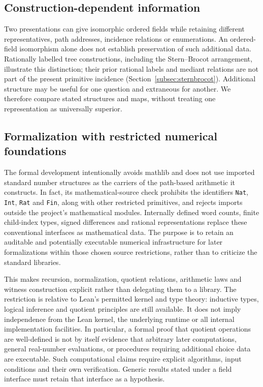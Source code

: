 \documentclass[11pt,reqno]{amsart}
\theoremstyle{definition}\newtheorem{definition}[theorem]{Definition}
\theoremstyle{remark}\newtheorem{remark}[theorem]{Remark}
\begin{document}
\subsection{Construction-dependent information}
Two presentations can give isomorphic ordered fields while retaining different representatives, path addresses, incidence relations or enumerations. An ordered-field isomorphism alone does not establish preservation of such additional data. Rationally labelled tree constructions, including the Stern--Brocot arrangement, illustrate this distinction; their prior rational labels and mediant relations are not part of the present primitive incidence (Section~\ref{subsec:sternbrocot}). Additional structure may be useful for one question and extraneous for another. We therefore compare stated structures and maps, without treating one representation as universally superior.

\subsection{Formalization with restricted numerical foundations}
The formal development intentionally avoids mathlib and does not use imported standard number structures as the carriers of the path-based arithmetic it constructs. In fact, its mathematical-source check prohibits the identifiers \texttt{Nat}, \texttt{Int}, \texttt{Rat} and \texttt{Fin}, along with other restricted primitives, and rejects imports outside the project's mathematical modules. Internally defined word counts, finite child-index types, signed differences and rational representations replace these conventional interfaces as mathematical data. The purpose is to retain an auditable and potentially executable numerical infrastructure for later formalizations within those chosen source restrictions, rather than to criticize the standard libraries.

This makes recursion, normalization, quotient relations, arithmetic laws and witness construction explicit rather than delegating them to a library. The restriction is relative to Lean's permitted kernel and type theory: inductive types, logical inference and quotient principles are still available. It does not imply independence from the Lean kernel, the underlying runtime or all internal implementation facilities. In particular, a formal proof that quotient operations are well-defined is not by itself evidence that arbitrary later computations, general real-number evaluations, or procedures requiring additional choice data are executable. Such computational claims require explicit algorithms, input conditions and their own verification. Generic results stated under a field interface must retain that interface as a hypothesis.
\end{document}
